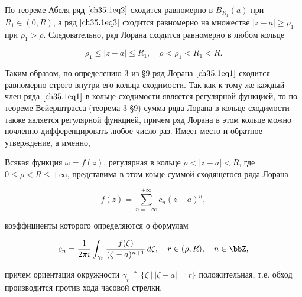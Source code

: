 По теореме Абеля ряд $\eqref{ch35.1eq2}$ сходится равномерно в $\overline{B_{R_1}(a)}$ при 
$R_1 \in (0,R)$, а ряд $\eqref{ch35.1eq3}$ сходится равномерно на множестве $|z - a| \ge \rho_1$ при $\rho_1 > \rho$. Следовательно, ряд Лорана сходится равномерно в любом кольце

$$
\rho_1 \le |z - a| \le R_1, \quad \rho < \rho_1 < R_1 < R.
$$

Таким образом, по определению 3 из \S 9 ряд Лорана $\eqref{ch35.1eq1}$ сходится равномерно строго внутри его кольца сходимости. Так как к тому же каждый член ряда $\eqref{ch35.1eq1}$ в кольце сходимости является регулярной функцией, то по теореме Вейерштрасса (теорема 3 \S 9) сумма ряда Лорана в кольце сходимости также является регулярной функцией, причем ряд Лорана в этом кольце можно почленно дифференцировать любое число раз.
Имеет место и обратное утверждение, а именно, 

\begin{thm} \label{ch35.1Thm1}
Всякая функция $\omega = f(z)$, регулярная в кольце $\rho < |z - a| < R$, где $0 \le \rho < R \le +\infty$, представима в этом коьце суммой сходящегося ряда Лорана

$$
f(z) = \sum\limits_{n = -\infty}^{+\infty} c_n(z - a)^n,
$$

коэффициенты которого определяются о формулам

\begin{equation} \label{ch35.1eq4}
c_n = \frac{1}{2\pi i} \int_{\gamma_r} \frac{f(\zeta)}{(\zeta - a)^{n + 1}} \,d\zeta, \quad r \in (\rho, R), \quad n \in \bbZ,
\end{equation}

причем ориентация окружности $\gamma_r \triangleq \{\zeta \: \big| \: |\zeta - a| = r\}$ положительная, т.е. обход производится против хода часовой стрелки.

\end{thm}

